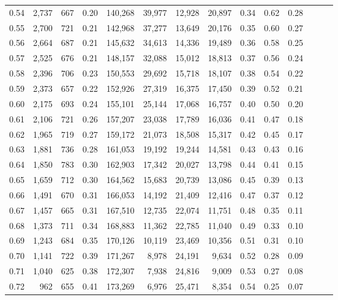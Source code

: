 \begin{tabular}{rrrrrrrrrrrrrr}
0.54 &  2,737 &  667 &  0.20 &  140,268 &   39,977 &  12,928 &  20,897 &  0.34 &  0.62 &      0.28 \\
0.55 &  2,700 &  721 &  0.21 &  142,968 &   37,277 &  13,649 &  20,176 &  0.35 &  0.60 &      0.27 \\
0.56 &  2,664 &  687 &  0.21 &  145,632 &   34,613 &  14,336 &  19,489 &  0.36 &  0.58 &      0.25 \\
0.57 &  2,525 &  676 &  0.21 &  148,157 &   32,088 &  15,012 &  18,813 &  0.37 &  0.56 &      0.24 \\
0.58 &  2,396 &  706 &  0.23 &  150,553 &   29,692 &  15,718 &  18,107 &  0.38 &  0.54 &      0.22 \\
0.59 &  2,373 &  657 &  0.22 &  152,926 &   27,319 &  16,375 &  17,450 &  0.39 &  0.52 &      0.21 \\
0.60 &  2,175 &  693 &  0.24 &  155,101 &   25,144 &  17,068 &  16,757 &  0.40 &  0.50 &      0.20 \\
0.61 &  2,106 &  721 &  0.26 &  157,207 &   23,038 &  17,789 &  16,036 &  0.41 &  0.47 &      0.18 \\
0.62 &  1,965 &  719 &  0.27 &  159,172 &   21,073 &  18,508 &  15,317 &  0.42 &  0.45 &      0.17 \\
0.63 &  1,881 &  736 &  0.28 &  161,053 &   19,192 &  19,244 &  14,581 &  0.43 &  0.43 &      0.16 \\
0.64 &  1,850 &  783 &  0.30 &  162,903 &   17,342 &  20,027 &  13,798 &  0.44 &  0.41 &      0.15 \\
0.65 &  1,659 &  712 &  0.30 &  164,562 &   15,683 &  20,739 &  13,086 &  0.45 &  0.39 &      0.13 \\
0.66 &  1,491 &  670 &  0.31 &  166,053 &   14,192 &  21,409 &  12,416 &  0.47 &  0.37 &      0.12 \\
0.67 &  1,457 &  665 &  0.31 &  167,510 &   12,735 &  22,074 &  11,751 &  0.48 &  0.35 &      0.11 \\
0.68 &  1,373 &  711 &  0.34 &  168,883 &   11,362 &  22,785 &  11,040 &  0.49 &  0.33 &      0.10 \\
0.69 &  1,243 &  684 &  0.35 &  170,126 &   10,119 &  23,469 &  10,356 &  0.51 &  0.31 &      0.10 \\
0.70 &  1,141 &  722 &  0.39 &  171,267 &    8,978 &  24,191 &   9,634 &  0.52 &  0.28 &      0.09 \\
0.71 &  1,040 &  625 &  0.38 &  172,307 &    7,938 &  24,816 &   9,009 &  0.53 &  0.27 &      0.08 \\
0.72 &    962 &  655 &  0.41 &  173,269 &    6,976 &  25,471 &   8,354 &  0.54 &  0.25 &      0.07 \\

\end{tabular}

